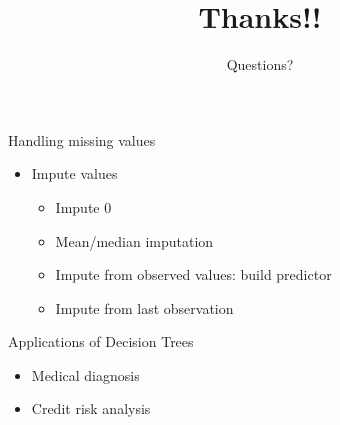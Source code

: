 \documentclass[aspectratio=169, 14pt]{beamer}
\begin{document}
\begin{frame}{Handling missing values}
	\begin{itemize}
		\item Impute values
			\begin{itemize}
				\item Impute 0
				\item Mean/median imputation
				\item Impute from observed values: build predictor
				\item Impute from last observation
	\end{itemize}
	\end{itemize}
	\end{frame}
\begin{frame}[t]{Applications of Decision Trees}
	\begin{itemize}
		\item Medical diagnosis
		\item Credit risk analysis
	\end{itemize}
\end{frame}
{\1
\begin{frame}
	\title{Thanks!!}
	\subtitle{Questions?}
	\titlepage
\end{frame}

}
\end{document}
